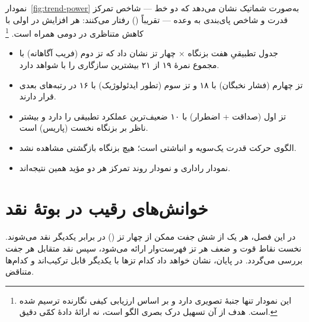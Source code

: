 نمودار~\ref{fig:trend-power} به‌صورت شماتیک نشان می‌دهد
که دو خط — شاخص تمرکز قدرت و شاخص پای‌بندی به وعده —
تقریباً  ()
رفتار می‌کنند:
هر افزایش در اولی با کاهش متناظری در دومی همراه است.%
\footnote{این نمودار تنها جنبهٔ تصویری دارد
و بر اساس ارزیابی کیفی نگارنده ترسیم شده است.
هدف از آن تسهیل درک بصری الگو است، نه ارائهٔ دادهٔ کمّی دقیق.}


\begin{principleBox}
\begin{itemize}
\item جدول تطبیقیِ هفت بزنگاه × چهار تز نشان داد که
      \textcolor{cAccent}{تز دوم (فریب آگاهانه)} با مجموع نمرهٔ ۱۹ از ۲۱
      بیشترین سازگاری را با شواهد دارد.
\item \textcolor{cConsolid}{تز چهارم (فشار نخبگان)} با ۱۸
      و \textcolor{cGold}{تز سوم (تطور ایدئولوژیک)} با ۱۶
      در رتبه‌های بعدی قرار دارند.
\item \textcolor{cGreen}{تز اول (صداقت + اضطرار)} با ۱۰
      ضعیف‌ترین عملکرد تطبیقی را دارد
      و بیشتر ناظر بر بزنگاه نخست (پاریس) است.
\item الگوی حرکت قدرت یک‌سویه و انباشتی است؛
      هیچ بزنگاه بازگشتی مشاهده نشد.
\item نمودار راداری و نمودار روند تمرکز
      هر دو مؤید همین نتیجه‌اند.
\end{itemize}
\end{principleBox}


\chapter{خوانش‌های رقیب در بوتهٔ نقد}
\label{ch:mutual-critique}

\begin{infoBox}
در این فصل، هر یک از شش جفت ممکن از چهار تز
()
در برابر یکدیگر نقد می‌شوند.
نخست نقاط قوت و ضعف هر تز فهرست‌وار ارائه می‌شود،
سپس نقد متقابل هر جفت بررسی می‌گردد.
در پایان،  نشان خواهد داد
کدام تزها با یکدیگر قابل ترکیب‌اند و کدام‌ها متناقض.
\end{infoBox}

